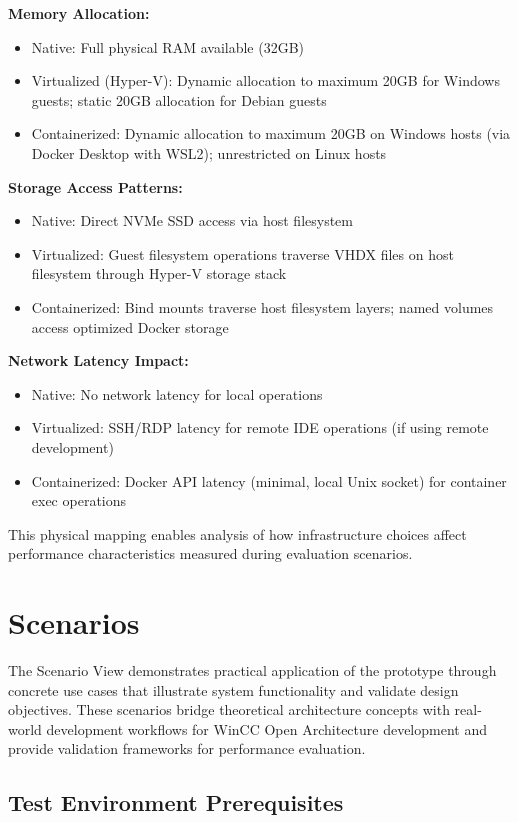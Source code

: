 \textbf{Memory Allocation:}
\begin{itemize}
\item Native: Full physical RAM available (32GB)
\item Virtualized (Hyper-V): Dynamic allocation to maximum 20GB for Windows guests; static 20GB allocation for Debian guests
\item Containerized: Dynamic allocation to maximum 20GB on Windows hosts (via Docker Desktop with WSL2); unrestricted on Linux hosts
\end{itemize}

\textbf{Storage Access Patterns:}
\begin{itemize}
\item Native: Direct NVMe SSD access via host filesystem
\item Virtualized: Guest filesystem operations traverse VHDX files on host filesystem through Hyper-V storage stack
\item Containerized: Bind mounts traverse host filesystem layers; named volumes access optimized Docker storage
\end{itemize}

\textbf{Network Latency Impact:}
\begin{itemize}
\item Native: No network latency for local operations
\item Virtualized: SSH/RDP latency for remote IDE operations (if using remote development)
\item Containerized: Docker API latency (minimal, local Unix socket) for container exec operations
\end{itemize}

This physical mapping enables analysis of how infrastructure choices affect performance characteristics measured during evaluation scenarios.

\section{Scenarios}
\label{sec:prototype_scenarios}

The Scenario View demonstrates practical application of the prototype through concrete use cases that illustrate system functionality and validate design objectives.
These scenarios bridge theoretical architecture concepts with real-world development workflows for WinCC Open Architecture development and provide validation frameworks for performance evaluation.

\subsection{Test Environment Prerequisites}

